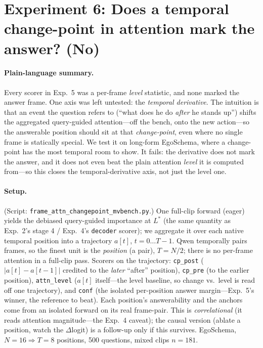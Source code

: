 \documentclass[11pt]{article}
\begin{document}
\section{Experiment 6: Does a temporal change-point in attention mark the answer? (No)}

\paragraph{Plain-language summary.}
Every scorer in Exp.~5 was a per-frame \emph{level} statistic, and none marked the answer
frame. One axis was left untested: the \emph{temporal derivative}. The intuition is that an
event the question refers to (``what does he do \emph{after} he stands up'') shifts the
aggregated query-guided attention---off the bench, onto the new action---so the answerable
position should sit at that \emph{change-point}, even where no single frame is statically
special. We test it on long-form EgoSchema, where a change-point has the most temporal room to
show. It fails: the derivative does not mark the answer, and it does not even beat the plain
attention \emph{level} it is computed from---so this closes the temporal-derivative axis, not
just the level one.

\paragraph{Setup.} (Script: \texttt{frame\_attn\_changepoint\_mvbench.py}.) One full-clip
forward (eager) yields the debiased query-guided importance at
$L^{\!*}$ (the same quantity as Exp.~2's stage 4 / Exp.~4's \texttt{decoder} scorer); we
aggregate it over each native temporal position into a trajectory $a[t]$, $t=0\ldots T{-}1$.
Qwen temporally pairs frames, so the finest unit is the \emph{position} (a pair), $T{=}N/2$;
there is no per-frame attention in a full-clip pass. Scorers on the trajectory:
\texttt{cp\_post} ($\lvert a[t]-a[t{-}1]\rvert$ credited to the \emph{later} ``after''
position), \texttt{cp\_pre} (to the earlier position), \texttt{attn\_level} ($a[t]$
itself---the level baseline, so change vs.\ level is read off one trajectory), and
\texttt{conf} (the isolated per-position answer margin---Exp.~5's winner, the reference to
beat). Each position's answerability and the anchors come from an isolated forward on its real
frame-pair. This is \emph{correlational} (it reads attention magnitude---the Exp.~4 caveat); the
causal version (ablate a position, watch the $\Delta$logit) is a follow-up only if this
survives. EgoSchema, $N{=}16\Rightarrow T{=}8$ positions, 500 questions, mixed clips $n{=}181$.
\end{document}
